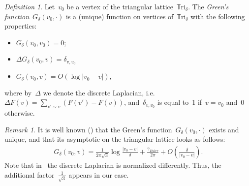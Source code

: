 \documentclass[reqno,11pt,a4paper]{amsart}
\theoremstyle{remark}
\newtheorem{definition}[proposition]{Definition}
\newtheorem{remark}[proposition]{Remark}
\newcommand{\T}{\mathbb{T}\mathrm{ri}}
\begin{document}
\begin{definition}
Let~$v_0$ be a vertex of the triangular lattice~$\T_\delta$.
The {\em Green's function}~$G_\delta(v_0,\cdot)$ is a (unique) function on vertices of~$\T_\delta$
with the following properties:
\begin{itemize}
\item $G_\delta(v_0,v_0) = 0$;
\item $\Delta G_\delta(v_0,v) = \delta_{v,v_0}$
\item $G_\delta(v_0,v) = O(\log |v_0 - v|)$,
\end{itemize}
where by~$\Delta$ we denote the discrete Laplacian, i.e.~$\Delta F(v) =\sum_{v'\sim v}{(F(v') - F(v))}$,
and~$\delta_{v,v_0}$ is equal to~1 if~$v=v_0$ and~0 otherwise.
\end{definition}

\begin{remark}
It is well known (\cite{Ken02,Spi01}) that the Green's function~$G_\delta(v_0,\cdot)$ exists and unique,
and that its asymptotic on the triangular lattice looks as follows:
\begin{align}
\label{eq:greens_function}
G_\delta(v_0,v) = \tfrac{1}{2\pi\sqrt{3}}\log \tfrac{|v_0 - v|}{\delta} + \tfrac{\gamma_{Euler}}{2\pi} + O(\tfrac{\delta}{|v_0 - v|}).
\end{align}
Note that in~\cite{Ken02} the discrete Laplacian is normalized differently.
Thus, the additional factor~$\frac{1}{\sqrt{3}}$ appears in our case.
\end{remark}
\end{document}

